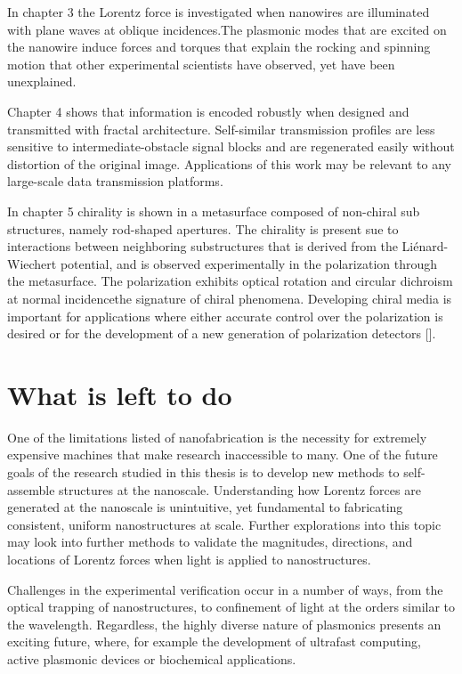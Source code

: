 In chapter 3 the Lorentz force is investigated when nanowires are illuminated with plane waves at oblique incidences.The plasmonic modes that are excited on the nanowire induce forces and torques that explain the rocking and spinning motion that other experimental scientists have observed, yet have been unexplained.

Chapter 4 shows that information is encoded robustly when designed and transmitted with fractal architecture. Self-similar transmission profiles are less sensitive to intermediate-obstacle signal blocks and are regenerated easily without distortion of the original image. Applications of this work may be relevant to any large-scale data transmission platforms.

In chapter 5 chirality is shown in a metasurface composed of non-chiral sub structures, namely rod-shaped apertures.  The chirality is present sue to interactions between neighboring substructures that is derived from the Li\'{e}nard-Wiechert potential, and is observed experimentally in the polarization through the metasurface. The polarization exhibits optical rotation and circular dichroism at normal incidence\textemdash the signature of chiral phenomena. Developing chiral media is important for applications where either accurate control over the polarization is desired or for the development of a new generation of polarization detectors [\cite{Mueller:16}].

\section{What is left to do}
One of the limitations listed of nanofabrication is the necessity for extremely expensive machines that make research inaccessible to many. One of the future goals of the research studied in this thesis is to develop new methods to self-assemble structures at the nanoscale. Understanding how Lorentz forces are generated at the nanoscale is unintuitive, yet fundamental to fabricating consistent, uniform nanostructures at scale. Further explorations into this topic may look into further methods to validate the magnitudes, directions, and locations of Lorentz forces when light is applied to nanostructures. 

Challenges in the experimental verification occur in a number of ways, from the optical trapping of nanostructures, to confinement of light at the orders similar to the wavelength. Regardless, the highly diverse nature of plasmonics presents an exciting future, where, for example the development of ultrafast computing, active plasmonic devices or biochemical applications.

